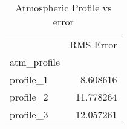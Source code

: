 \begin{table}
\caption{Atmospheric Profile vs error}
\begin{tabular}{lr}
 & RMS Error \\
atm_profile &  \\
profile_1 & 8.608616 \\
profile_2 & 11.778264 \\
profile_3 & 12.057261 \\
\end{tabular}
\end{table}
